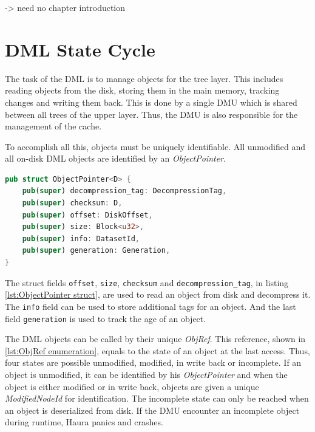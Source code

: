 \documentclass[
	12pt,
	a4paper,
	abstract,
	bibliography=totoc,
	chapterprefix,
	headings=openright,
	numbers=endperiod,
	parskip=half,
	twoside,
]{scrreprt}
\begin{document}

-> need no chapter introduction


\section{DML State Cycle}

The task of the DML is to manage objects for the tree layer. This includes reading objects from the disk, storing them in the main memory, tracking changes and writing them back.
This is done by a single DMU which is shared between all trees of the upper layer.
Thus, the DMU is also responsible for the management of the cache.

To accomplish all this, objects must be uniquely identifiable.
All unmodified and all on-disk DML objects are identified by an \emph{ObjectPointer}.

\bigskip
{}

\begin{lstlisting}[language=Rust,mathescape=true,caption=ObjectPointer struct ,label=lst:ObjectPointer struct]
pub struct ObjectPointer<D> {
    pub(super) decompression_tag: DecompressionTag,
    pub(super) checksum: D,
    pub(super) offset: DiskOffset,
    pub(super) size: Block<u32>,
    pub(super) info: DatasetId,
    pub(super) generation: Generation,
}
\end{lstlisting}

The struct fields \texttt{offset}, \texttt{size}, \texttt{checksum} and \texttt{decompression\_tag}, in listing \ref{lst:ObjectPointer struct}, are used to read an object from disk and decompress it.
The \texttt{info} field can be used to store additional tags for an object.
And the last field \texttt{generation} is used to track the age of an object.

The DML objects can be called by their unique \emph{ObjRef}.
This reference, shown in \ref{lst:ObjRef enumeration}, equals to the state of an object at the last access.
Thus, four states are possible unmodified, modified, in write back or incomplete.
If an object is unmodified, it can be identified by his \emph{ObjectPointer} and
when the object is either modified or in write back, objects are given a unique \emph{ModifiedNodeId} for identification.
The incomplete state can only be reached when an object is deserialized from disk.
If the DMU encounter an incomplete object during runtime, Haura panics and crashes.
\end{document}
